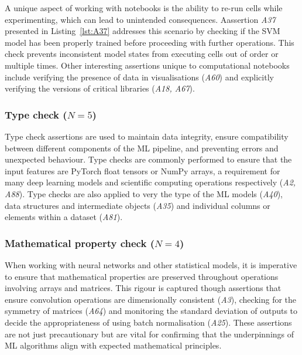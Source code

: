 A unique aspect of working with notebooks is the ability to re-run cells while experimenting, which can lead to unintended consequences. Aassertion \emph{A37} presented in Listing~\ref{lst:A37} addresses this scenario by checking if the SVM model has been properly trained before proceeding with further operations. This check prevents inconsistent model states from executing cells out of order or multiple times. Other interesting assertions unique to computational notebooks include verifying the presence of data in visualisations (\emph{A60}) and explicitly verifying the versions of critical libraries (\emph{A18, A67}).


\subsubsection{Type check ($N = 5$)}

Type check assertions are used to maintain data integrity, ensure compatibility between different components of the ML pipeline, and preventing errors and unexpected behaviour. Type checks are commonly performed to ensure that the input features are PyTorch float tensors or NumPy arrays, a requirement for many deep learning models and scientific computing operations respectively (\emph{A2, A88}). Type checks are also applied to very the type of the ML models (\emph{A40}), data structures and intermediate objects (\emph{A35}) and individual columns or elements within a dataset (\emph{A81}).


\subsubsection{Mathematical property check ($N = 4$)}

When working with neural networks and other statistical models, it is imperative to ensure that mathematical properties are preserved throughout operations involving arrays and matrices. This rigour is captured though assertions that ensure convolution operations are dimensionally consistent (\emph{A3}), checking for the symmetry of matrices (\emph{A64}) and monitoring the standard deviation of outputs to decide the appropriateness of using batch normalisation (\emph{A25}). These assertions are not just precautionary but are vital for confirming that the underpinnings of ML algorithms align with expected mathematical principles.


